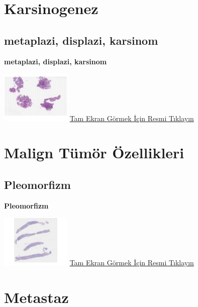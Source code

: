 \documentclass[
  letterpaper,
  DIV=11,
  numbers=noendperiod]{scrreprt}
\begin{document}
\hypertarget{sec-karsinogenez}{%
\chapter{Karsinogenez}\label{sec-karsinogenez}}

\hypertarget{sec-mepaplazi-displazi-karsinom}{%
\section{metaplazi, displazi,
karsinom}\label{sec-mepaplazi-displazi-karsinom}}

\textbf{metaplazi, displazi, karsinom}

\href{https://images.patolojiatlasi.com/carcinogenesis/HE.html}{\includegraphics[width=0.25\textwidth,height=\textheight]{./screenshots/thumbnail_carcinogenesis.png}}
\href{https://images.patolojiatlasi.com/carcinogenesis/HE.html}{Tam
Ekran Görmek İçin Resmi Tıklayın}

\hypertarget{sec-malign-tumor-ozellikleri}{%
\chapter{Malign Tümör Özellikleri}\label{sec-malign-tumor-ozellikleri}}

\hypertarget{sec-pleomorfizm}{%
\section{Pleomorfizm}\label{sec-pleomorfizm}}

\textbf{Pleomorfizm}

\href{https://images.patolojiatlasi.com/pleomorphism/HE.html}{\includegraphics[width=0.25\textwidth,height=\textheight]{./screenshots/thumbnail_pleomorphism.png}}
\href{https://images.patolojiatlasi.com/pleomorphism/HE.html}{Tam Ekran
Görmek İçin Resmi Tıklayın}

\hypertarget{sec-metastaz}{%
\chapter{Metastaz}\label{sec-metastaz}}
\end{document}
